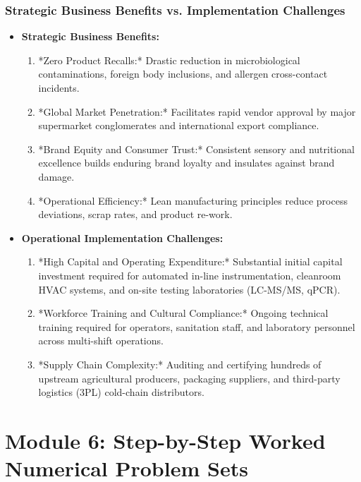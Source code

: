 \documentclass[11pt,a4paper,oneside]{article}
\begin{document}
\subsubsection{Strategic Business Benefits vs. Implementation Challenges}
\begin{itemize}[leftmargin=*]
    \item \textbf{Strategic Business Benefits:}
    \begin{enumerate}
        \item *Zero Product Recalls:* Drastic reduction in microbiological contaminations, foreign body inclusions, and allergen cross-contact incidents.
        \item *Global Market Penetration:* Facilitates rapid vendor approval by major supermarket conglomerates and international export compliance.
        \item *Brand Equity and Consumer Trust:* Consistent sensory and nutritional excellence builds enduring brand loyalty and insulates against brand damage.
        \item *Operational Efficiency:* Lean manufacturing principles reduce process deviations, scrap rates, and product re-work.
    \end{enumerate}
    \item \textbf{Operational Implementation Challenges:}
    \begin{enumerate}
        \item *High Capital and Operating Expenditure:* Substantial initial capital investment required for automated in-line instrumentation, cleanroom HVAC systems, and on-site testing laboratories (LC-MS/MS, qPCR).
        \item *Workforce Training and Cultural Compliance:* Ongoing technical training required for operators, sanitation staff, and laboratory personnel across multi-shift operations.
        \item *Supply Chain Complexity:* Auditing and certifying hundreds of upstream agricultural producers, packaging suppliers, and third-party logistics (3PL) cold-chain distributors.
    \end{enumerate}
\end{itemize}

\newpage

\section{Module 6: Step-by-Step Worked Numerical Problem Sets}
\end{document}
